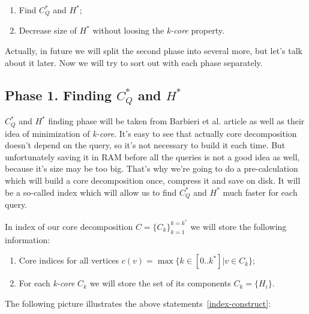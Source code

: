 \begin{enumerate}
  \item Find $C_Q^*$ and $H^*$;
  \item Decrease size of $H^*$ without loosing the \textit{k-core} property. 
\end{enumerate}

Actually, in future we will split the second phase into several more, but let's talk about it later. Now we will try to sort out with each phase separately.

\subsection{Phase 1. Finding $C_Q^*$ and $H^*$}

$C_Q^*$ and $H^*$ finding phase will be taken from Barbieri et al. article \cite{Barbieri15} as well as their idea of minimization of \textit{k-core}. It's easy to see that actually core decomposition doesn't depend on the query, so it's not necessary to build it each time. But unfortunately saving it in RAM before all the queries is not a good idea as well, because it's size may be too big. That's why we're going to do a pre-calculation which will build a core decomposition once, compress it and save on disk. It will be a so-called index which will allow us to find $C_Q^*$ and $H^*$ much faster for each query.

In index of our core decomposition $C = \{C_k\}_{k = 1}^{k = k^*}$ we will store the following information:

\begin{enumerate}
  \item Core indices for all vertices $c(v) = \max\{k \in [0..k^*] | v \in C_k \}$;
  \item For each \textit{k-core} $C_k$ we will store the set of its components $C_k = \{H_i\}$.
\end{enumerate}

The following picture illustrates the above statements~\ref{index-construct}:

